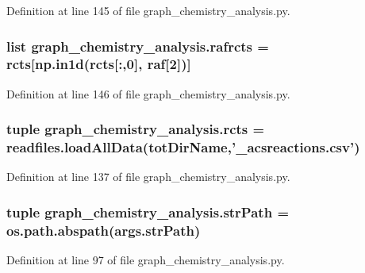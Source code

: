 Definition at line 145 of file graph\-\_\-chemistry\-\_\-analysis.\-py.

\hypertarget{a00103_abcbd149fd36b6e318e2ff5db08256c7f}{
\subsubsection[{rafrcts}]{\setlength{\rightskip}{0pt plus 5cm}list graph\-\_\-chemistry\-\_\-analysis.\-rafrcts = {\bf rcts}\mbox{[}np.\-in1d({\bf rcts}\mbox{[}\-:,0\mbox{]}, raf\mbox{[}2\mbox{]})\mbox{]}}}\label{a00103_abcbd149fd36b6e318e2ff5db08256c7f}


Definition at line 146 of file graph\-\_\-chemistry\-\_\-analysis.\-py.

\hypertarget{a00103_a9b52fd0d4ec8369bdc21d79c282a0c87}{
\subsubsection[{rcts}]{\setlength{\rightskip}{0pt plus 5cm}tuple graph\-\_\-chemistry\-\_\-analysis.\-rcts = readfiles.\-load\-All\-Data({\bf tot\-Dir\-Name},'\-\_\-acsreactions.\-csv')}}\label{a00103_a9b52fd0d4ec8369bdc21d79c282a0c87}


Definition at line 137 of file graph\-\_\-chemistry\-\_\-analysis.\-py.

\hypertarget{a00103_afcc190cd479c93d1f2442b3214b0765d}{
\subsubsection[{str\-Path}]{\setlength{\rightskip}{0pt plus 5cm}tuple graph\-\_\-chemistry\-\_\-analysis.\-str\-Path = os.\-path.\-abspath(args.\-str\-Path)}}\label{a00103_afcc190cd479c93d1f2442b3214b0765d}


Definition at line 97 of file graph\-\_\-chemistry\-\_\-analysis.\-py.


